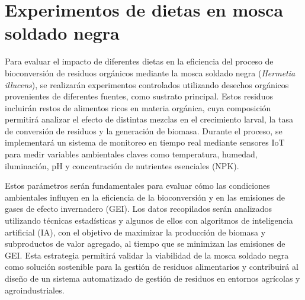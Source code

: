 \section{Experimentos de dietas en mosca soldado negra}

Para evaluar el impacto de diferentes dietas en la eficiencia del proceso de bioconversión de residuos orgánicos mediante la mosca soldado negra (\textit{Hermetia illucens}), se realizarán experimentos controlados utilizando desechos orgánicos provenientes de diferentes fuentes, como sustrato principal. Estos residuos incluirán restos de alimentos ricos en materia orgánica, cuya composición permitirá analizar el efecto de distintas mezclas en el crecimiento larval, la tasa de conversión de residuos y la generación de biomasa. Durante el proceso, se implementará un sistema de monitoreo en tiempo real mediante sensores IoT para medir variables ambientales claves como temperatura, humedad, iluminación, pH y concentración de nutrientes esenciales (NPK).
 
Estos parámetros serán fundamentales para evaluar cómo las condiciones ambientales influyen en la eficiencia de la bioconversión y en las emisiones de gases de efecto invernadero (GEI). Los datos recopilados serán analizados  utilizando técnicas estadísticas y algunos de ellos con algoritmos de inteligencia artificial (IA), con el objetivo de maximizar la producción de biomasa y subproductos de valor agregado, al tiempo que se minimizan las emisiones de GEI. Esta estrategia permitirá validar la viabilidad de la mosca soldado negra como solución sostenible para la gestión de residuos alimentarios y contribuirá al diseño de un sistema automatizado de gestión de residuos en entornos agrícolas y agroindustriales.